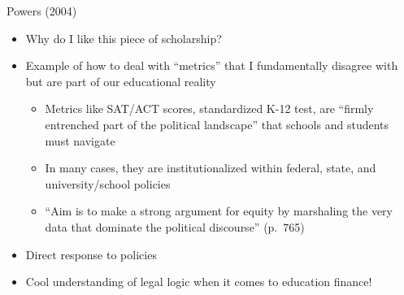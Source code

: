 \documentclass[8pt,ignorenonframetext,dvipsnames]{beamer}
\providecommand{\tightlist}{%
  \setlength{\itemsep}{0pt}\setlength{\parskip}{0pt}}
\let\olditem\item
\renewcommand{\item}{%
  \olditem\vspace{4pt}
}
\begin{document}
\begin{frame}{Powers (2004)}
\protect\hypertarget{powers-2004-3}{}

\begin{itemize}
\tightlist
\item
  Why do I like this piece of scholarship?
\item
  Example of how to deal with ``metrics'' that I fundamentally disagree
  with but are part of our educational reality

  \begin{itemize}
  \tightlist
  \item
    Metrics like SAT/ACT scores, standardized K-12 test, are ``firmly
    entrenched part of the political landscape'' that schools and
    students must navigate
  \item
    In many cases, they are institutionalized within federal, state, and
    university/school policies
  \item
    ``Aim is to make a strong argument for equity by marshaling the very
    data that dominate the political discourse'' (p.~765)
  \end{itemize}
\item
  Direct response to policies
\item
  Cool understanding of legal logic when it comes to education finance!
\end{itemize}

\end{frame}
\end{document}
